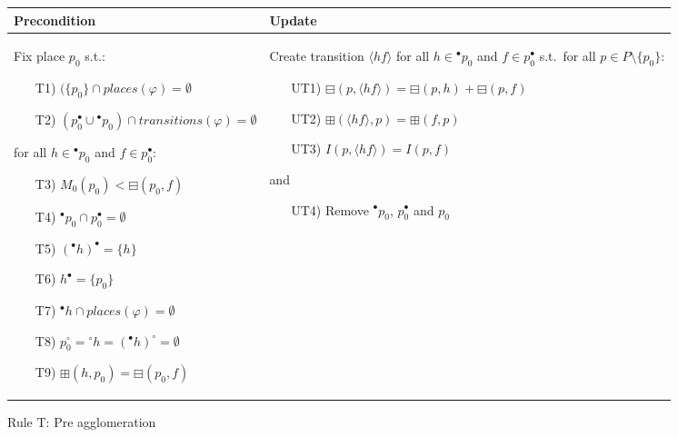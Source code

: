 \begin{figure}[h!]
    \centering
    \begin{adjustbox}{center}
        \begin{tabular}{|p{75mm}|p{75mm}|} \hline
        Precondition & Update \\ \hline
        Fix place $p_0$ s.t.:
        \begin{itemize}[leftmargin=10mm]
            \item[T1)] $(\{p_0\} \cap places(\varphi) = \emptyset$
            \item[T2)] $(p_0^\bullet \cup {}^\bullet p_0) \cap transitions(\varphi) = \emptyset$
        \end{itemize}
        \noindent for all $h\in{}^\bullet p_0$ and $f \in p_0^\bullet$:
        \begin{itemize}[leftmargin=10mm]
            \item[T3)] $M_0(p_0) < \boxminus(p_0,f)$
            \item[T4)] $^\bullet p_0 \cap p_0^\bullet = \emptyset$
            \item[T5)] $({}^\bullet h)^\bullet = \{h\}$
            \item[T6)] $h^\bullet=\{p_0\}$
            \item[T7)] ${}^\bullet h \cap places(\varphi) = \emptyset$
            \item[T8)] $p_0^\circ = {}^\circ h = ({}^\bullet h)^\circ = \emptyset$
            \item[T9)] $\boxplus(h, p_0) = \boxminus(p_0,f)$
        \end{itemize}


        &
        Create transition $\langle hf\rangle$ for all $h\in{}^\bullet p_0$ and $f\in p_0^\bullet$ s.t.\ for all $p\in P\setminus\{p_0\}$:
        \begin{itemize}[leftmargin=12mm]
            \item[UT1)] $\boxminus(p,\langle hf\rangle)=\boxminus(p,h)+\boxminus(p,f)$
            \item[UT2)] $\boxplus(\langle hf\rangle,p)=\boxplus(f,p)$
            \item[UT3)] $I(p,\langle hf\rangle) = I(p,f)$
        \end{itemize}
        \noindent and
        \begin{itemize}[leftmargin=12mm]
            \item[UT4)] Remove ${}^\bullet p_0$, $p_0^\bullet $ and $p_0$

        \end{itemize} \\ \hline
        \end{tabular}
    \end{adjustbox}
    \caption{Rule T: Pre agglomeration}
    \label{fig:rule_t}
\end{figure}